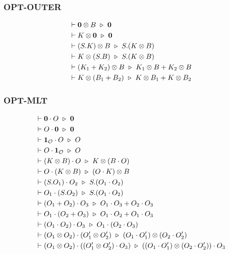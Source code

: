 \subsubsection*{\textsf{OPT-OUTER}}
\begin{align*}
  & \vdash \mathbf{0} \otimes B \ \triangleright\  \mathbf{0} \\
  & \vdash K \otimes \mathbf{0} \ \triangleright\  \mathbf{0} \\
  & \vdash (S.K) \otimes B \ \triangleright\  S.(K \otimes B) \\
  & \vdash K \otimes (S.B) \ \triangleright\  S.(K \otimes B) \\
  & \vdash (K_1 + K_2) \otimes B \ \triangleright\  K_1 \otimes B + K_2 \otimes B \\
  & \vdash K \otimes (B_1 + B_2) \ \triangleright\  K \otimes B_1 + K \otimes B_2
\end{align*}

\subsubsection*{\textsf{OPT-MLT}}
\begin{align*}
  & \vdash \mathbf{0} \cdot O \ \triangleright\  \mathbf{0} \\
  & \vdash O \cdot \mathbf{0} \ \triangleright\  \mathbf{0} \\
  & \vdash \mathbf{1}_\mathcal{O} \cdot O \ \triangleright\  O \\
  & \vdash O \cdot \mathbf{1}_\mathcal{O} \ \triangleright\  O \\
  & \vdash (K \otimes B) \cdot O \ \triangleright\  K \otimes (B \cdot O)\\
  & \vdash O \cdot (K \otimes B) \ \triangleright\  (O \cdot K) \otimes B\\
  & \vdash (S.O_1) \cdot O_2 \ \triangleright\  S.(O_1 \cdot O_2) \\
  & \vdash O_1 \cdot (S.O_2) \ \triangleright\  S.(O_1 \cdot O_2) \\
  & \vdash (O_1 + O_2) \cdot O_3 \ \triangleright\  O_1 \cdot O_3 + O_2 \cdot O_3 \\
  & \vdash O_1 \cdot (O_2 + O_3) \ \triangleright\  O_1 \cdot O_2 + O_1 \cdot O_3 \\
  & \vdash (O_1 \cdot O_2) \cdot O_3 \ \triangleright\  O_1 \cdot (O_2 \cdot O_3) \\
  & \vdash (O_1 \otimes O_2) \cdot (O_1' \otimes O_2') \ \triangleright\  (O_1 \cdot O_1') \otimes (O_2 \cdot O_2') \\
  & \vdash (O_1 \otimes O_2) \cdot ((O_1' \otimes O_2') \cdot O_3) \ \triangleright\  ((O_1 \cdot O_1') \otimes (O_2 \cdot O_2')) \cdot O_3
\end{align*}



